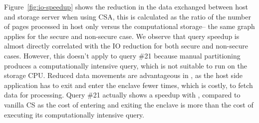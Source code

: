Figure~\ref{fig:io-speedup} shows the reduction in the data exchanged between host and storage server when using CSA, this is calculated as the ratio of the number of pages processed in host only versus the computational storage-- the same graph applies for the secure and non-secure case.
We observe that query speedup is almost directly correlated with the IO reduction for both secure and non-secure cases. However, this doesn't apply to query \#21 because manual partitioning produces a computationally intensive query, which is not suitable to run on the storage CPU.
Reduced data movements are advantageous in \project{}, as the host side application has to exit and enter the enclave fewer times, which is costly, to fetch data for processing.
Query \#21 actually shows a speedup with \project{}, compared to vanilla CS as the cost of entering and exiting the enclave is more than the cost of executing its computationally intensive query. 


